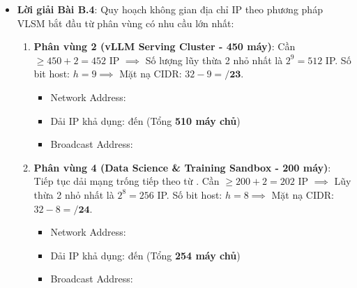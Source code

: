 \begin{itemize}
\begin{enumerate}
    \item Băng thông tối đa khi bộ đệm TCP bị giới hạn ở $4\text{ MB}$ ($32 \times 10^6\text{ bits}$):
    Theo lý thuyết cửa sổ trượt TCP, băng thông tối đa bị giới hạn bởi:
    \begin{equation*}
    \text{Throughput}_{\max} = \frac{\text{TCP Window Size}}{RTT} = \frac{4 \times 10^6 \times 8\text{ bits}}{0.08\text{ s}} = 400 \times 10^6\text{ bps} = \mathbf{400\text{ Mbps}}
    \end{equation*}
    Tỷ lệ khai thác công suất đường truyền:
    \begin{equation*}
    \eta = \frac{400\text{ Mbps}}{10.000\text{ Mbps}} \times 100\% = \mathbf{4.0\%!}
    \end{equation*}
    Hơn $96\%$ băng thông đường truyền chuyên dụng đắt đỏ xuyên biển bị lãng phí hoàn toàn do tiến trình gửi phải dừng lại chờ ACK vì tràn cửa sổ TCP!
    
    \item Cấu hình tham số kernel sysctl tối ưu:
    Để đạt $100\%$ băng thông $10\text{ Gbps}$, cửa sổ bộ đệm tối thiểu phải bằng $BDP = 100\text{ MB}$. Thực tế công nghiệp khuyến nghị cấu hình bằng $1.25 \times BDP = 125\text{ MB}$ ($125 \times 10^6\text{ bytes}$) để bù trừ overhead tiêu đề.
  \end{enumerate}

  \item \textbf{Lời giải Bài B.4}:
  Quy hoạch không gian địa chỉ IP theo phương pháp VLSM bắt đầu từ phân vùng có nhu cầu lớn nhất:
  \begin{enumerate}
    \item \textbf{Phân vùng 2 (vLLM Serving Cluster - 450 máy)}:
    Cần $\ge 450 + 2 = 452$ IP $\implies$ Số lượng lũy thừa 2 nhỏ nhất là $2^9 = 512$ IP.
    Số bit host: $h = 9 \implies$ Mặt nạ CIDR: $32 - 9 = \mathbf{/23}$.
    \begin{itemize}
      \item Network Address: 
      \item Dải IP khả dụng:  đến  (Tổng \textbf{510 máy chủ})
      \item Broadcast Address: 
    \end{itemize}
    
    \item \textbf{Phân vùng 4 (Data Science \& Training Sandbox - 200 máy)}:
    Tiếp tục dải mạng trống tiếp theo từ .
    Cần $\ge 200 + 2 = 202$ IP $\implies$ Lũy thừa 2 nhỏ nhất là $2^8 = 256$ IP.
    Số bit host: $h = 8 \implies$ Mặt nạ CIDR: $32 - 8 = \mathbf{/24}$.
    \begin{itemize}
      \item Network Address: 
      \item Dải IP khả dụng:  đến  (Tổng \textbf{254 máy chủ})
      \item Broadcast Address: 
    \end{itemize}
    

\end{enumerate}
\end{itemize}

